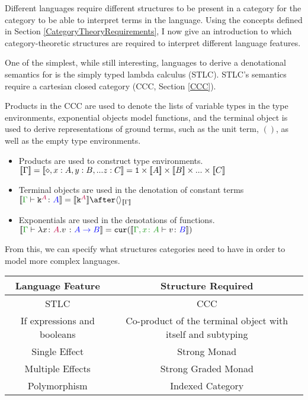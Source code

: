 \documentclass{Report}
\begin{document}
Different languages require different structures to be present in a category for the category to be able to interpret terms in the language. Using the concepts defined in Section \ref{CategoryTheoryRequirements}, I now give an introduction to which category-theoretic structures are required to interpret different language features. 

One of the simplest, while still interesting, languages to derive a denotational semantics for is the simply typed lambda calculus (STLC)\@. STLC's semantics require a cartesian closed category (CCC, Section \ref{CCC}).

Products in the CCC are used to denote the lists of variable types in the type environments, exponential objects model functions, and the terminal object is used to derive representations of ground terms, such as the unit term, $()$, as well as the empty type environments.

\begin{itemize}
    \item Products are used to construct type environments. $\deno{\G} = \deno{\nil, x: A, y:B, ... z:C} = \1 \times \deno{A} \times \deno{B} \times ... \times \deno{C}$
    \item Terminal objects are used in the denotation of constant terms $\deno{\gtyperelation{\const{A}}{A}} = \deno{\const{A}}\after\term{\deno{\G}}$
    \item Exponentials are used in the denotations of functions. $\deno{\typerelation{\G}{\lam{x}{A}{v}}{\ab}} = \cur{\deno{\typerelation{\gax}{v}{B}}}$
\end{itemize}

From this, we can specify what structures categories need to have in order to model more complex languages.
\begin{center}
    \begin{tabular}{|c|c|}
        \hline
        Language Feature & Structure Required \\
        \hline
        \hline
        STLC            & CCC \\
        \hline
        If expressions and booleans   & Co-product of the terminal object with itself and subtyping \\
        \hline
        Single Effect   & Strong Monad \\
        \hline
        Multiple Effects & Strong Graded Monad \\
        \hline
        Polymorphism & Indexed Category \\
        \hline
    \end{tabular}
\end{center}
\end{document}
